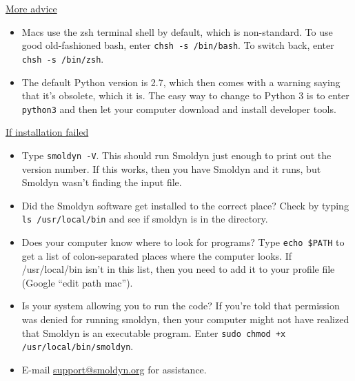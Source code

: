 \documentclass {scrbook}
\newcommand {\ttt} {\texttt}
\begin{document}
\underline{More advice}
\begin{itemize}
\item Macs use the zsh terminal shell by default, which is non-standard. To use good old-fashioned bash, enter \ttt{chsh -s /bin/bash}. To switch back, enter \ttt{chsh -s /bin/zsh}.

\item The default Python version is 2.7, which then comes with a warning saying that it's obsolete, which it is. The easy way to change to Python 3 is to enter \ttt{python3} and then let your computer download and install developer tools.

\end{itemize}

\underline{If installation failed}

\begin{itemize}
\item Type \ttt{smoldyn -V}. This should run Smoldyn just enough to print out the version number. If this works, then you have Smoldyn and it runs, but Smoldyn wasn't finding the input file.

\item Did the Smoldyn software get installed to the correct place? Check by typing \ttt{ls /usr/local/bin} and see if smoldyn is in the directory.

\item Does your computer know where to look for programs? Type \ttt{echo \$PATH} to get a list of colon-separated places where the computer looks. If /usr/local/bin isn't in this list, then you need to add it to your profile file (Google ``edit path mac'').

\item Is your system allowing you to run the code? If you're told that permission was denied for running smoldyn, then your computer might not have realized that Smoldyn is an executable program. Enter \ttt{sudo chmod +x /usr/local/bin/smoldyn}.

\item E-mail \href{support@smoldyn.org}{support@smoldyn.org} for assistance.

\end{itemize}
\end{document}
